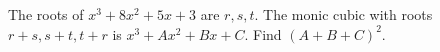 The roots of $x^3+8x^2+5x+3$ are $r,s,t$. The monic cubic with roots $r+s,s+t,t+r$ is $x^3+Ax^2+Bx+C$. Find $(A+B+C)^2$.
